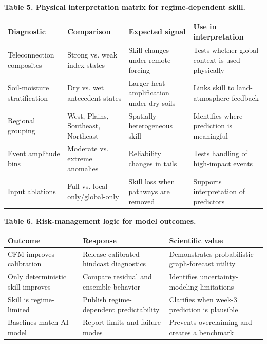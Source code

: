 \documentclass[11pt,letterpaper]{article}
\begin{document}
\begin{center}\scriptsize
\textbf{Table 5. Physical interpretation matrix for regime-dependent skill.}\\[0.03in]
\begin{tabularx}{\textwidth}{p{}p{}p{}X}
\toprule
\textbf{Diagnostic} & \textbf{Comparison} & \textbf{Expected signal} & \textbf{Use in interpretation}\\
\midrule
Teleconnection composites & Strong vs. weak index states & Skill changes under remote forcing & Tests whether global context is used physically\\
Soil-moisture stratification & Dry vs. wet antecedent states & Larger heat amplification under dry soils & Links skill to land-atmosphere feedback\\
Regional grouping & West, Plains, Southeast, Northeast & Spatially heterogeneous skill & Identifies where prediction is meaningful\\
Event amplitude bins & Moderate vs. extreme anomalies & Reliability changes in tails & Tests handling of high-impact events\\
Input ablations & Full vs. local-only/global-only & Skill loss when pathways are removed & Supports interpretation of predictors\\
\bottomrule
\end{tabularx}
\end{center}

\begin{center}\scriptsize
\textbf{Table 6. Risk-management logic for model outcomes.}\\[0.03in]
\begin{tabularx}{\textwidth}{p{}p{}X}
\toprule
\textbf{Outcome} & \textbf{Response} & \textbf{Scientific value}\\
\midrule
CFM improves calibration & Release calibrated hindcast diagnostics & Demonstrates probabilistic graph-forecast utility\\
Only deterministic skill improves & Compare residual and ensemble behavior & Identifies uncertainty-modeling limitations\\
Skill is regime-limited & Publish regime-dependent predictability & Clarifies when week-3 prediction is plausible\\
Baselines match AI model & Report limits and failure modes & Prevents overclaiming and creates a benchmark\\
\bottomrule
\end{tabularx}
\end{center}
\end{document}
